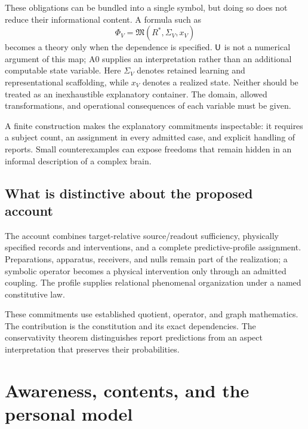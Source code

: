 These obligations can be bundled into a single symbol, but doing so does not reduce their informational content. A formula such as
\[
\Phi_V=\mathfrak M(R^\ast,\Sigma_V,x_V)
\]
becomes a theory only when the dependence is specified. $\mathsf{U}$ is not a numerical argument of this map; A0 supplies an interpretation rather than an additional computable state variable. Here $\Sigma_V$ denotes retained learning and representational scaffolding, while $x_V$ denotes a realized state. Neither should be treated as an inexhaustible explanatory container. The domain, allowed transformations, and operational consequences of each variable must be given.

A finite construction makes the explanatory commitments inspectable: it requires a subject count, an assignment in every admitted case, and explicit handling of reports. Small counterexamples can expose freedoms that remain hidden in an informal description of a complex brain.

\section{What is distinctive about the proposed account}\label{section:problem:what-is-distinctive-about-the-proposed-account}
The account combines target-relative source/readout sufficiency, physically specified records and interventions, and a complete predictive-profile assignment. Preparations, apparatus, receivers, and nulls remain part of the realization; a symbolic operator becomes a physical intervention only through an admitted coupling. The profile supplies relational phenomenal organization under a named constitutive law.

These commitments use established quotient, operator, and graph mathematics. The contribution is the constitution and its exact dependencies. The conservativity theorem distinguishes report predictions from an aspect interpretation that preserves their probabilities.

\chapter{Awareness, contents, and the personal model}\label{ch:distinctions}
